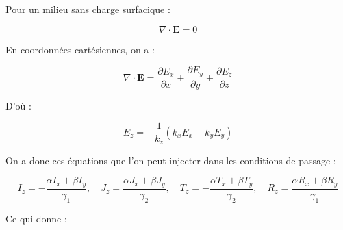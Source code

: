 \documentclass{article}
\begin{document}
Pour un milieu sans charge surfacique :

\[
\nabla \cdot \mathbf{E} = 0
\]

En coordonnées cartésiennes, on a :

\[
\nabla \cdot \mathbf{E} = \frac{\partial E_x}{\partial x} + \frac{\partial E_y}{\partial y} + \frac{\partial E_z}{\partial z}
\]

D'où :

\[
E_z = -\frac{1}{k_z} \left( k_x E_x + k_y E_y \right)
\]

\bigskip

On a donc ces équations que l'on peut injecter dans les conditions de passage :

\[
I_z = -\frac{\alpha I_x + \beta I_y}{\gamma_1}, \quad
J_z = \frac{\alpha J_x + \beta J_y}{\gamma_2}, \quad
T_z = -\frac{\alpha T_x + \beta T_y}{\gamma_2}, \quad
R_z = \frac{\alpha R_x + \beta R_y}{\gamma_1}
\]

Ce qui donne : 
\end{document}
